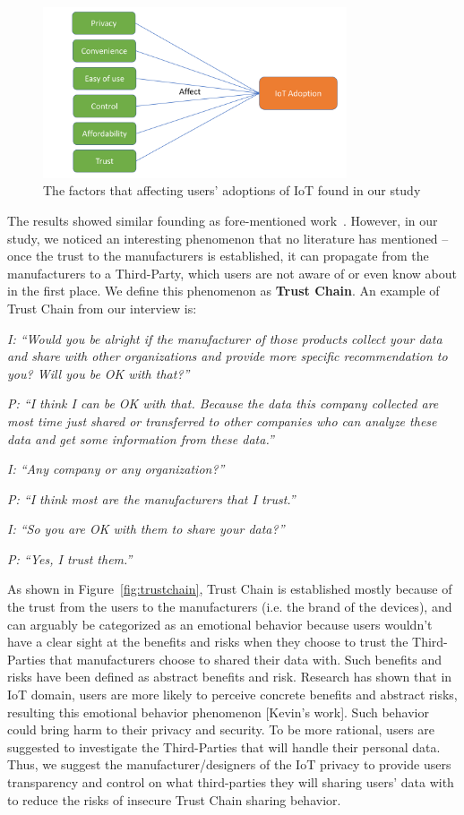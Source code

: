 \begin{figure}
	\centering
	\includegraphics[width=0.8\textwidth]{Proposal/figures/pilot_study_model.pdf}
	\caption{The factors that affecting users' adoptions of IoT found in our study}
	\label{fig:pilotstudymodel}
\end{figure}

The results showed similar founding as fore-mentioned work~\cite{gao2014unified, al2016modeling}. However, in our study, we noticed an interesting phenomenon that no literature has mentioned -- once the trust to the manufacturers is established, it can propagate from the manufacturers to a Third-Party, which users are not aware of or even know about in the first place. We define this phenomenon as \textbf{Trust Chain}. An example of Trust Chain from our interview is:

\textit{I: ``Would you be alright if the manufacturer of those products collect your data and share with other organizations and provide more specific recommendation to you? Will you be OK with that?''}

\textit{P: ``I think I can be OK with that. Because the data this company collected are most time just shared or transferred to other companies who can analyze these data and get some information from these data.''}

\textit{I: ``Any company or any organization?''}

\textit{P: ``I think most are the manufacturers that I trust.''}

\textit{I: ``So you are OK with them to share your data?''}

\textit{P: ``Yes, I trust them.''}

As shown in Figure~\ref{fig:trustchain}, Trust Chain is established mostly because of the trust from the users to the manufacturers (i.e. the brand of the devices), and can arguably be categorized as an emotional behavior because users wouldn't have a clear sight at the benefits and risks when they choose to trust the Third-Parties that manufacturers choose to shared their data with. Such benefits and risks have been defined as abstract benefits and risk. Research has shown that in IoT domain, users are more likely to perceive concrete benefits and abstract risks, resulting this emotional behavior phenomenon [Kevin's work]. Such behavior could bring harm to their privacy and security. To be more rational, users are suggested to investigate the Third-Parties that will handle their personal data. Thus, we suggest the manufacturer/designers of the IoT privacy to provide users transparency and control on what third-parties they will sharing users' data with to reduce the risks of insecure Trust Chain sharing behavior.

